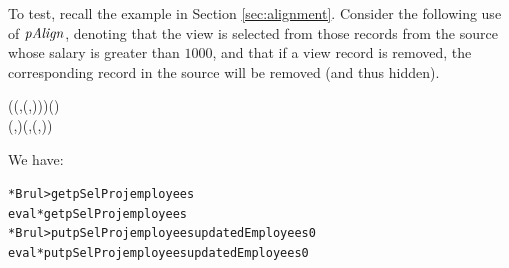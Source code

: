 
To test, recall the example in Section \ref{sec:alignment}.
Consider the following use of \ensuremath{\Varid{pAlign}}, denoting that the view is selected
from those records from the source whose salary is greater than \ensuremath{\mathrm{1000}}, and that
if a view record is removed, the corresponding record in the source will be removed (and thus hidden).
\begin{hscode}\SaveRestoreHook
{}%
%
%
\>[B]{}\mathrel{=}\;(\lambda (,(,))\to {}\mathbin{>})\;\;\;\;\;(\;){}\<[E]%
\\
\>[B]{}\<[3]%
\>[3]{}\;\;(,)\mathrel{=}(,(,)){}\<[E]%
\ColumnHook
\end{hscode}\resethooks
We have:
\begin{alltt}
*Brul> get pSelProj employees
eval*{get pSelProj employees}
*Brul> put pSelProj employees updatedEmployees0
eval*{put pSelProj employees updatedEmployees0}
\end{alltt}

